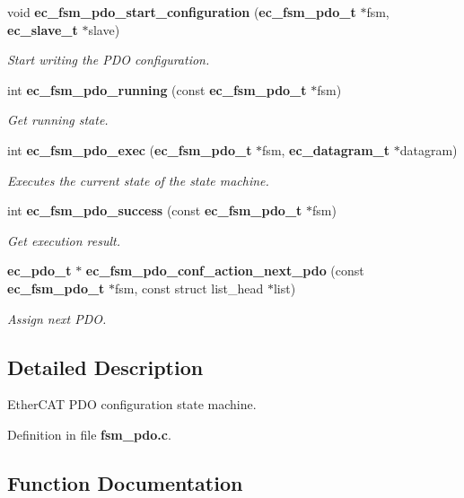 \begin{DoxyCompactItemize}
void {\bf ec\-\_\-fsm\-\_\-pdo\-\_\-start\-\_\-configuration} ({\bf ec\-\_\-fsm\-\_\-pdo\-\_\-t} $\ast$fsm, {\bf ec\-\_\-slave\-\_\-t} $\ast$slave)
\begin{DoxyCompactList}\small\item\em Start writing the P\-D\-O configuration. \end{DoxyCompactList}\item 
int {\bf ec\-\_\-fsm\-\_\-pdo\-\_\-running} (const {\bf ec\-\_\-fsm\-\_\-pdo\-\_\-t} $\ast$fsm)
\begin{DoxyCompactList}\small\item\em Get running state. \end{DoxyCompactList}\item 
int {\bf ec\-\_\-fsm\-\_\-pdo\-\_\-exec} ({\bf ec\-\_\-fsm\-\_\-pdo\-\_\-t} $\ast$fsm, {\bf ec\-\_\-datagram\-\_\-t} $\ast$datagram)
\begin{DoxyCompactList}\small\item\em Executes the current state of the state machine. \end{DoxyCompactList}\item 
int {\bf ec\-\_\-fsm\-\_\-pdo\-\_\-success} (const {\bf ec\-\_\-fsm\-\_\-pdo\-\_\-t} $\ast$fsm)
\begin{DoxyCompactList}\small\item\em Get execution result. \end{DoxyCompactList}\item 
{\bf ec\-\_\-pdo\-\_\-t} $\ast$ {\bf ec\-\_\-fsm\-\_\-pdo\-\_\-conf\-\_\-action\-\_\-next\-\_\-pdo} (const {\bf ec\-\_\-fsm\-\_\-pdo\-\_\-t} $\ast$fsm, const struct list\-\_\-head $\ast$list)
\begin{DoxyCompactList}\small\item\em Assign next P\-D\-O. \end{DoxyCompactList}\end{DoxyCompactItemize}


\subsection{Detailed Description}
Ether\-C\-A\-T P\-D\-O configuration state machine. 

Definition in file {\bf fsm\-\_\-pdo.\-c}.



\subsection{Function Documentation}
